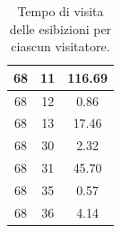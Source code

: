 \documentclass[12pt]{article}
\begin{document}
\begin{table}[!ht]
\begin{tabular}{|c|c|c|}
        68                  & 11                  & 116.69                   \\ \hline
        68                  & 12                  & 0.86                     \\ \hline
        68                  & 13                  & 17.46                    \\ \hline
        68                  & 30                  & 2.32                     \\ \hline
        68                  & 31                  & 45.70                    \\ \hline
        68                  & 35                  & 0.57                     \\ \hline
        68                  & 36                  & 4.14                     \\ \hline
    \end{tabular}
    \caption{Tempo di visita delle esibizioni per ciascun visitatore.}
    \label{persons_time_visiting}
    \end{table}
        
\end{document}
